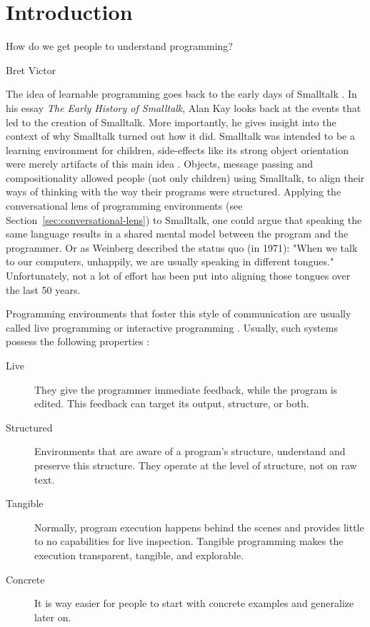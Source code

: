 \chapter{Introduction}
\label{cha:introduction}
\epigraph{How do we get people to understand programming?}{Bret Victor}

The idea of learnable programming \cite{victor_learnable_2012} goes back to the early days of Smalltalk \cite{kay_early_1993}.
In his essay \emph{The Early History of Smalltalk}, Alan Kay looks back at the events that led to the creation of Smalltalk.
More importantly, he gives insight into the context of why Smalltalk turned out how it did.
Smalltalk was intended to be a learning environment for children, side-effects like its strong object orientation were merely artifacts of this main idea \cite{kay_early_1993}.
Objects, message passing and compositionality allowed people (not only children) using Smalltalk, to align their ways of thinking with the way their programs were structured.
Applying the conversational lens of programming environments (see Section~\ref{sec:conversational-lens}) to Smalltalk, one could argue that speaking the same language results in a shared mental model between the program and the programmer.
Or as Weinberg \cite{weinberg_psychology_1971} described the status quo (in 1971): "When we talk to our computers, unhappily, we are usually speaking in different tongues."
Unfortunately, not a lot of effort has been put into aligning those tongues over the last 50 years.

Programming environments that foster this style of communication are usually called live programming\cite{aguiar_live_2019, church_liveness_2010} or interactive programming \cite{czaplicki_interactive_2013, mccabe_towards_2023}.
Usually, such systems possess the following properties \cite{burg_1st_2013}:
\begin{description}
    \item[Live] They give the programmer immediate feedback, while the program is edited. This feedback can target its output, structure, or both.
    \item[Structured] Environments that are aware of a program's structure, understand and preserve this structure. They operate at the level of structure, not on raw text.
    \item[Tangible] Normally, program execution happens behind the scenes and provides little to no capabilities for live inspection. Tangible programming makes the execution transparent, tangible, and explorable.
    \item[Concrete] It is way easier for people to start with concrete examples and generalize later on.
\end{description}

